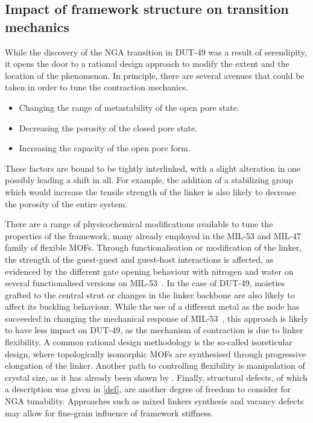 
\subsection{Impact of framework structure on transition mechanics}%
\label{dut:comparison}

While the discovery of the NGA transition in DUT-49 was a result 
of serendipity, it opens the door to a rational design approach 
to modify the extent and the location of the phenomenon. In principle,
there are several avenues that could be taken in order to tune the 
contraction mechanics.
\begin{itemize}
    \item Changing the range of metastability of the open pore state.
    \item Decreasing the porosity of the closed pore state.
    \item Increasing the capacity of the open pore form.
\end{itemize}
These factors are bound to be tightly interlinked, with a slight 
alteration in one possibly leading a shift in all. For example, the 
addition of a stabilizing group which would increase the tensile 
strength of the linker is also likely to decrease the porosity 
of the entire system.

There are a range of physicochemical modifications available to 
tune the properties of the framework, many already employed in the
MIL-53 and MIL-47 family of flexible MOFs.
Through functionalisation or modification of the linker, the strength of the guest-guest
and guest-host interactions is affected, as evidenced by the different
gate opening behaviour with nitrogen and water on several functionalised
versions on MIL-53~\cite{biswasNewFunctionalizedFlexible2011}.
In the case of DUT-49, moieties grafted to the central strut or changes
in the linker backbone are also likely to affect its buckling behaviour.
While the use of a different metal as the node has succeeded in
changing the mechanical response of 
MIL-53~\cite{yotImpactMetalCentre2016}, this 
approach is likely to have less impact on DUT-49, as the mechanism of 
contraction is due to linker flexibility.
A common rational design methodology is the so-called isoreticular design,
where topologically isomorphic MOFs are synthesised through progressive elongation
of the linker. Another path to controlling flexibility is manipulation of crystal 
size, as it has already been shown by \citet{krauseEffectCrystalliteSize2018}.
Finally, structural defects, of which a description was given 
in \autoref{def}, are another degree of freedom to consider for NGA 
tunability. Approaches such as mixed linkers synthesis and vacancy defects
may allow for fine-grain influence of framework stiffness.

